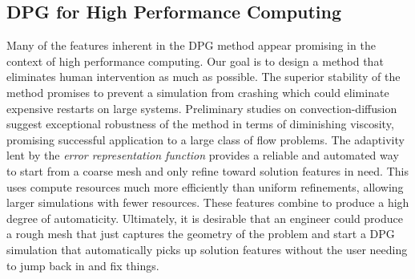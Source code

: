 \documentclass[preprint,12pt]{elsarticle}
\begin{document}
\subsection{DPG for High Performance Computing}
Many of the features inherent in the DPG method appear promising in the context of high performance computing.
Our goal is to design a method that eliminates human intervention as much as possible.
The superior stability of the method promises to prevent a simulation from crashing which could eliminate expensive restarts on large systems.
Preliminary studies on convection-diffusion suggest exceptional robustness of the method in terms of diminishing viscosity, 
promising successful application to a large class of flow problems.
The adaptivity lent by the \emph{error representation function} provides a reliable and automated way to start from a coarse mesh and only refine
toward solution features in need. 
This uses compute resources much more efficiently than uniform refinements, allowing larger simulations with fewer resources.
These features combine to produce a high degree of automaticity.
Ultimately, it is desirable that an engineer could produce a rough mesh that just captures the geometry of the problem and
start a DPG simulation that automatically picks up solution features without the user needing to jump back in and fix things.
\end{document}

